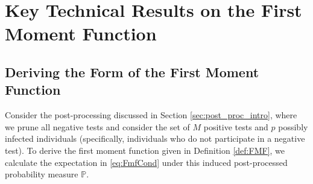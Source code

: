 \documentclass[12pt,reqno]{amsart}
\numberwithin{equation}{section}
\theoremstyle{definition}
\newtheorem{remark}[theorem]{Remark}
\renewcommand{\P}{\mathbb{P}}
\renewcommand{\[}{\begin{equation}}
\renewcommand{\]}{\end{equation}}
\renewcommand{\|}{\bigg{|}}
\newcommand{\maxwell}[1]{\textcolor{Goldenrod}{\;Max: #1}}
\begin{document}



\section{Key Technical Results on the First Moment Function}\label{sec:FMFDerivation} 

\subsection{Deriving the Form of the First Moment Function}
Consider the post-processing discussed in Section \ref{sec:post_proc_intro}, where we prune all negative tests and consider the set of $M$ positive tests and $p$ possibly infected individuals (specifically, individuals who do not participate in a negative test). To derive the first moment function given in Definition \ref{def:FMF}, we calculate the expectation in \eqref{eq:FmfCond} under this induced post-processed probability measure $\P$. 
\end{document}

